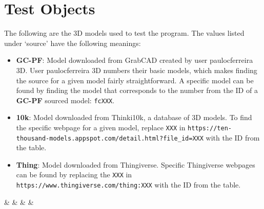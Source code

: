 \chapter{Test Objects}\label{App:model_table}

The following are the 3D models used to test the program.
The values listed under `source' have the following meanings:
\begin{itemize}
	\item \textbf{GC-PF}: Model downloaded from GrabCAD created by user paulocferreira 3D\cite{GC-PF}.
		User paulocferreira 3D numbers their basic models, which makes finding the source for a given model fairly straightforward.
		A specific model can be found by finding the model that corresponds to the number from the ID of a \textbf{GC-PF} sourced model: \verb|fcXXX|.
	\item \textbf{10k}: Model downloaded from Thinki10k, a database of 3D models\cite{Thingi10k_paper, Thingi10k_app}.
		To find the specific webpage for a given model, replace \verb|XXX| in \verb|https://ten-thousand-models.appspot.com/detail.html?file_id=XXX| with the ID from the table.
	\item \textbf{Thing}: Model downloaded from Thingiverse.
		Specific Thingiverse webpages can be found by replacing the \verb|XXX| in \verb|https://www.thingiverse.com/thing:XXX| with the ID from the table.
\end{itemize}

 {%
	\id & \src & \mesh & \class & \outcome
}%

